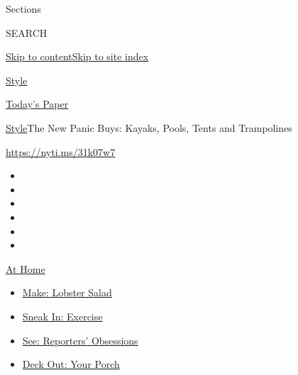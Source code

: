 Sections

SEARCH

\protect\hyperlink{site-content}{Skip to
content}\protect\hyperlink{site-index}{Skip to site index}

\href{https://www.nytimes3xbfgragh.onion/section/style}{Style}

\href{https://myaccount.nytimes3xbfgragh.onion/auth/login?response_type=cookie\&client_id=vi}{}

\href{https://www.nytimes3xbfgragh.onion/section/todayspaper}{Today's
Paper}

\href{/section/style}{Style}\textbar{}The New Panic Buys: Kayaks, Pools,
Tents and Trampolines

\url{https://nyti.ms/31k07w7}

\begin{itemize}
\item
\item
\item
\item
\item
\item
\end{itemize}

\href{https://www.nytimes3xbfgragh.onion/spotlight/at-home?action=click\&pgtype=Article\&state=default\&region=TOP_BANNER\&context=at_home_menu}{At
Home}

\begin{itemize}
\tightlist
\item
  \href{https://www.nytimes3xbfgragh.onion/2020/08/14/dining/lobster-salad-recipe.html?action=click\&pgtype=Article\&state=default\&region=TOP_BANNER\&context=at_home_menu}{Make:
  Lobster Salad}
\item
  \href{https://www.nytimes3xbfgragh.onion/2020/08/15/at-home/coronavirus-at-home-quick-exercises.html?action=click\&pgtype=Article\&state=default\&region=TOP_BANNER\&context=at_home_menu}{Sneak
  In: Exercise}
\item
  \href{https://www.nytimes3xbfgragh.onion/interactive/2020/at-home/even-more-reporters-editors-diaries-lists-recommendations.html?action=click\&pgtype=Article\&state=default\&region=TOP_BANNER\&context=at_home_menu}{See:
  Reporters' Obsessions}
\item
  \href{https://www.nytimes3xbfgragh.onion/2020/08/15/at-home/coronavirus-fall-patio-furniture.html?action=click\&pgtype=Article\&state=default\&region=TOP_BANNER\&context=at_home_menu}{Deck
  Out: Your Porch}
\end{itemize}


